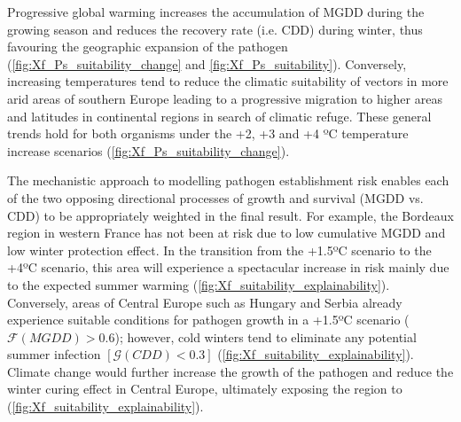 Progressive global warming increases the accumulation of MGDD during the
growing season and reduces the recovery rate (i.e. CDD) during winter, thus
favouring the geographic expansion of the pathogen
(\cref{fig:Xf_Ps_suitability_change} and \cref{fig:Xf_Ps_suitability}).
Conversely, increasing temperatures tend to reduce the climatic suitability of
vectors in more arid areas of southern Europe leading to a progressive
migration to higher areas and latitudes in continental regions in search of
climatic refuge. These general trends hold for both organisms under the +2, +3
and +4 ºC temperature increase scenarios
(\cref{fig:Xf_Ps_suitability_change}).

The mechanistic approach to modelling pathogen establishment risk enables
each of the two opposing directional processes of growth and survival (MGDD vs.
CDD) to be appropriately weighted in the final result. For example, the
Bordeaux region in western France has not been at risk due to low cumulative
MGDD and low winter protection effect.	In the transition from the +1.5ºC
scenario to the +4ºC scenario, this area will experience a spectacular increase
in risk mainly due to the expected summer warming
(\cref{fig:Xf_suitability_explainability}). Conversely, areas of Central
Europe such as Hungary and Serbia already experience suitable conditions for
pathogen growth in a +1.5ºC scenario ($\mathcal{F}(MGDD) > 0.6$); however, cold
winters tend to eliminate any potential summer infection $[\mathcal{G}(CDD) <
            0.3]$ (\cref{fig:Xf_suitability_explainability}). Climate change
would further
increase the growth of the pathogen  and reduce the winter curing effect in
Central Europe, ultimately exposing the region to \xf{}
(\cref{fig:Xf_suitability_explainability}).

